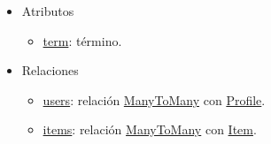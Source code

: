 \begin{itemize}
    \begin{itemize}
        \item Atributos
        \begin{itemize}
            \item \underline{term}: término.
        \end{itemize}
        \item Relaciones
        \begin{itemize}
            \item \underline{users}: relación \underline{ManyToMany} con \underline{Profile}.
            \item \underline{items}: relación \underline{ManyToMany} con \underline{Item}.
        \end{itemize}
    \end{itemize}
\end{itemize}